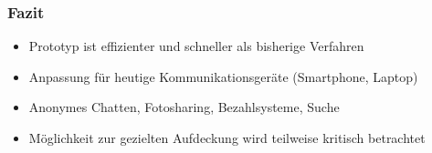 \documentclass[t, xcolor=dvipsnames]{beamer}
\begin{document}
\begin{frame}
	\frametitle{Fazit}
 
			\begin{itemize}
				\item Prototyp ist effizienter und schneller als bisherige Verfahren
				\item Anpassung für heutige Kommunikationsgeräte (Smartphone, Laptop)
				\item Anonymes Chatten, Fotosharing, Bezahlsysteme, Suche
				\item Möglichkeit zur gezielten Aufdeckung wird teilweise kritisch betrachtet
			\end{itemize}

	\vspace{\fill}
\end{frame}
\end{document}
